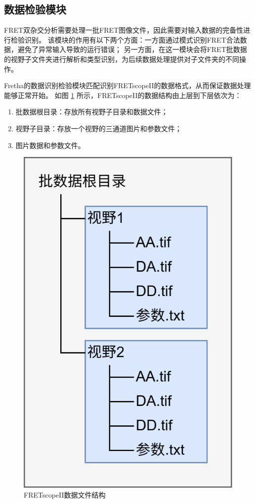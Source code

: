\subsection{数据检验模块}
\label{sec:数据检验模块}

FRET双杂交分析需要处理一批FRET图像文件，因此需要对输入数据的完备性进行检验识别。
该模块的作用有以下两个方面：一方面通过模式识别FRET合法数据，避免了异常输入导致的运行错误；
另一方面，在这一模块会将FRET批数据的视野子文件夹进行解析和类型识别，为后续数据处理提供对子文件夹的不同操作。

Fretha的数据识别检验模块匹配识别FRETscopeII的数据格式，从而保证数据处理能够正常开始。
如图 \ref{fig:fretscope_data_struct} 所示，FRETscopeII的数据结构由上层到下层依次为：
\begin{enumerate}
  \item 批数据根目录：存放所有视野子目录和数据文件；
  \item 视野子目录：存放一个视野的三通道图片和参数文件；
  \item 图片数据和参数文件。
\end{enumerate}

\begin{figure}[htbp]
    \centering
    \includegraphics[height=0.5\linewidth]{../figures/2/2_FRETscopeII数据格式.drawio.png}
    \caption{FRETscopeII数据文件结构}
    \label{fig:fretscope_data_struct}
\end{figure}

